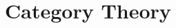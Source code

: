 \documentclass[12pt,openany]{book}
\begin{document}

\tableofcontents
\newpage

%

\chapter{Category Theory}

%
%
%



\newpage
%
\end{document}
